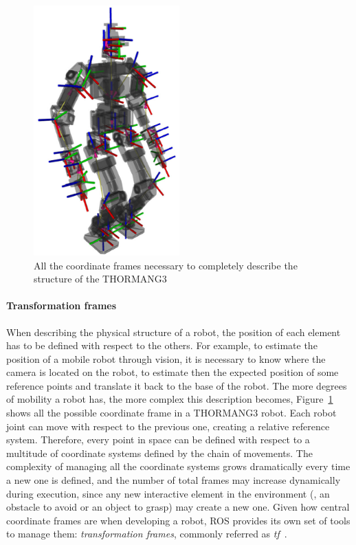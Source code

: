\begin{figure}[t]
    \centering
    \includegraphics[width=0.5\textwidth]{gfx/ros/tf_frames}
    \caption{All the coordinate frames necessary to completely describe the structure of the THORMANG3}\label{fig:ros-tf}
\end{figure}

\paragraph{Transformation frames} When describing the physical structure of a robot, the position of each element has to be defined with respect to the others. For example, to estimate the position of a mobile robot through vision, it is necessary to know where the camera is located on the robot, to estimate then the expected position of some reference points and translate it back to the base of the robot. The more degrees of mobility a robot has, the more complex this description becomes, Figure~\ref{fig:ros-tf} shows all the possible coordinate frame in a THORMANG3 robot. Each robot joint can move with respect to the previous one, creating a relative reference system. Therefore, every point in space can be defined with respect to a multitude of coordinate systems defined by the chain of movements. The complexity of managing all the coordinate systems grows dramatically every time a new one is defined, and the number of total frames may increase dynamically during execution, since any new interactive element in the environment (\eg, an obstacle to avoid or an object to grasp)  may create a new one. Given how central coordinate frames are when developing a robot, ROS provides its own set of tools to manage them: \textit{transformation frames}, commonly referred as \textit{tf}~\cite{foote2013tf}.

